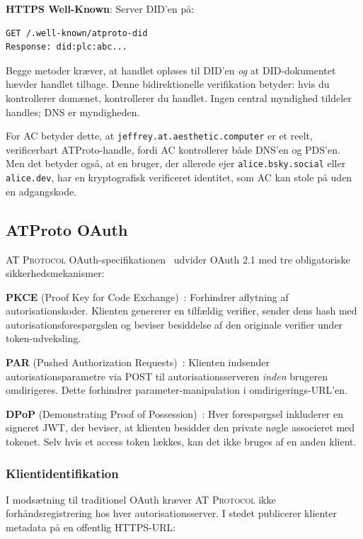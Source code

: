 \documentclass[10pt,letterpaper,twocolumn]{article}
\newcommand{\atproto}{\textsc{AT Protocol}}
\begin{document}
\textbf{HTTPS Well-Known}: Server DID'en på:
\begin{lstlisting}
GET /.well-known/atproto-did
Response: did:plc:abc...
\end{lstlisting}

Begge metoder kræver, at handlet opløses til DID'en \emph{og} at DID-dokumentet hævder handlet tilbage. Denne bidirektionelle verifikation betyder: hvis du kontrollerer domænet, kontrollerer du handlet. Ingen central myndighed tildeler handles; DNS er myndigheden.

For AC betyder dette, at \texttt{jeffrey.at.aesthetic.computer} er et reelt, verificerbart ATProto-handle, fordi AC kontrollerer både DNS'en og PDS'en. Men det betyder også, at en bruger, der allerede ejer \texttt{alice.bsky.social} eller \texttt{alice.dev}, har en kryptografisk verificeret identitet, som AC kan stole på uden en adgangskode.

\subsection{ATProto OAuth}

\atproto{} OAuth-specifikationen~\citep{atproto2024oauth} udvider OAuth 2.1 med tre obligatoriske sikkerhedsmekanismer:

\textbf{PKCE} (Proof Key for Code Exchange)~\citep{rfc7636pkce}: Forhindrer aflytning af autorisationskoder. Klienten genererer en tilfældig verifier, sender dens hash med autorisationsforespørgslen og beviser besiddelse af den originale verifier under token-udveksling.

\textbf{PAR} (Pushed Authorization Requests)~\citep{rfc9126par}: Klienten indsender autorisationsparametre via POST til autorisationsserveren \emph{inden} brugeren omdirigeres. Dette forhindrer parameter-manipulation i omdirigerings-URL'en.

\textbf{DPoP} (Demonstrating Proof of Possession)~\citep{rfc9449dpop}: Hver forespørgsel inkluderer en signeret JWT, der beviser, at klienten besidder den private nøgle associeret med tokenet. Selv hvis et access token lækkes, kan det ikke bruges af en anden klient.

\subsubsection{Klientidentifikation}

I modsætning til traditionel OAuth kræver \atproto{} ikke forhåndsregistrering hos hver autorisationsserver. I stedet publicerer klienter metadata på en offentlig HTTPS-URL:
\end{document}
